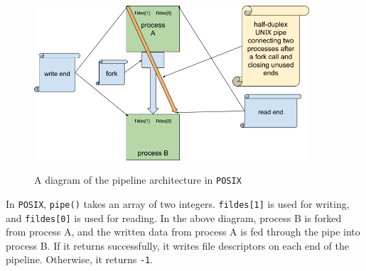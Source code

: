 \documentclass[12pt, dvipsnames, a4paper]{article}
\newcommand{\code}[1]{\texttt{#1}}
\begin{document}
\begin{figure}[hbt!]
	\centering
	\includegraphics[width=290pt]{assets/localipc2.png}
	\caption{A diagram of the pipeline architecture in \code{POSIX}} \cite{rytarowski}
\end{figure}

In \code{POSIX}, \code{pipe()} takes an array of two integers. \code{fildes[1]} is used for writing, and \code{fildes[0]} is used for reading. In the above diagram, process B is forked from process A, and the written data from process A is fed through the pipe into process B. If it returns successfully, it writes file descriptors on each end of the pipeline. Otherwise, it returns \code{-1}.

\clearpage
\end{document}
